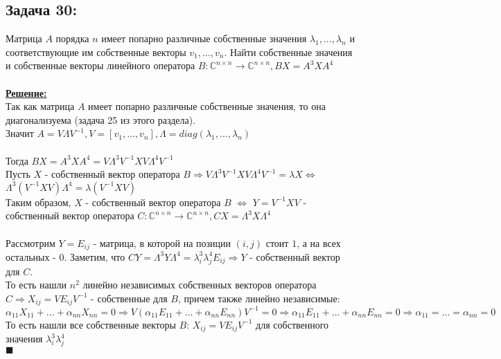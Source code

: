 \documentclass[a4paper,12pt,titlepage,final]{article}
\begin{document}
\subsection*{Задача 30:}
\noindent Матрица $A$ порядка $n$ имеет попарно различные собственные значения $\lambda_1, ... , \lambda_n$ 
и соответствующие им собственные векторы $v_1, ... , v_n$. Найти собственные значения и собственные векторы линейного оператора 
$B: \mathbb{C}^{n \times n} \rightarrow \mathbb{C}^{n \times n}, BX = A^3 X A^4$ \\ \\
\textbf{\underline{Решение:}} \\
Так как матрица $A$ имеет попарно различные собственные значения, то она диагонализуема (задача 25 из этого раздела). \\
Значит $A = V\Lambda V^{-1}, V = [v_1, ... , v_n], \Lambda = diag(\lambda_1, ... , \lambda_n)$ \\ \\
Тогда $BX = A^3 X A^4 = V \Lambda^3 V^{-1} XV\Lambda^4 V^{-1}$ \\
Пусть $X$ - собственный вектор оператора $B \Rightarrow V \Lambda^3 V^{-1} XV\Lambda^4 V^{-1} = \lambda X \iff$ 
$\Lambda^3 (V^{-1} XV)\Lambda^4 = \lambda (V^{-1} XV)$ \\
Таким образом, $X$ - собственный вектор оператора $B$ $\iff$ $Y = V^{-1} XV$ - собственный вектор оператора 
$C: \mathbb{C}^{n \times n} \rightarrow \mathbb{C}^{n \times n}, CX = \Lambda^3 X \Lambda^4$ \\ \\
Рассмотрим $Y = E_{ij}$ - матрица, в которой на позиции $(i, j)$ стоит $1$, а на всех остальных - $0$. Заметим, что 
$CY = \Lambda^3 Y \Lambda^4 = \lambda_i^3 \lambda_j^4 E_{ij} \Rightarrow Y$ - собственный вектор для $C$. \\
То есть нашли $n^2$ линейно независимых собственных векторов оператора $C \Rightarrow 
X_{ij} = VE_{ij}V^{-1}$ - собственные для $B$, причем также линейно независимые: \\
$\alpha_{11}X_{11} + ... + \alpha_{nn}X_{nn} = 0 \Rightarrow V(\alpha_{11}E_{11} + ... + \alpha_{nn}E_{nn})V^{-1} = 0 
\Rightarrow \alpha_{11}E_{11} + ... + \alpha_{nn}E_{nn} = 0 \Rightarrow \alpha_{11} = ... = \alpha_{nn} = 0$ \\
То есть нашли все собственные векторы $B$: $X_{ij} = VE_{ij}V^{-1}$ для собственного значения $\lambda_i^3 \lambda_j^4$ \\
$\blacksquare$ \\ \\ \\
\end{document}
